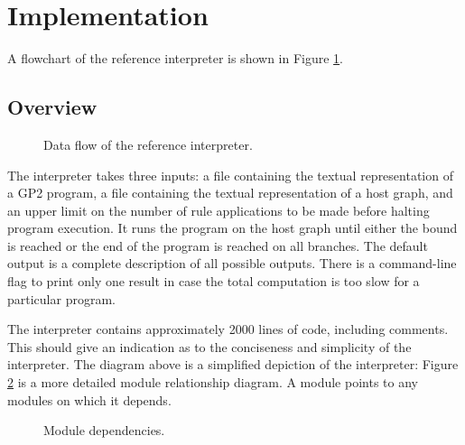 \section{Implementation}

A flowchart of the reference interpreter is shown in Figure \ref{fig:architecture}.
\subsection{Overview}

\begin{figure}
\centering

\caption{Data flow of the reference interpreter.} \label{fig:architecture}
\end{figure}

The interpreter takes three inputs: a file containing the textual representation of a GP2 program, a file containing the textual representation of a host graph, and an upper limit on the number of rule applications to be made before halting program execution. It runs the program on the host graph until either the bound is reached or the end of the program is reached on all branches. The default output is a complete description of all possible outputs. There is a command-line flag to print only one result in case the total computation is too slow for a particular program.

The interpreter contains approximately 2000 lines of code, including comments. This should give an indication as to the conciseness and simplicity of the interpreter. The diagram above is a simplified depiction of the interpreter: Figure \ref{fig:modules} is a more detailed module relationship diagram. A module points to any modules on which it depends. 

\begin{figure}
\centering

\caption{Module dependencies.} \label{fig:modules}
\end{figure}

